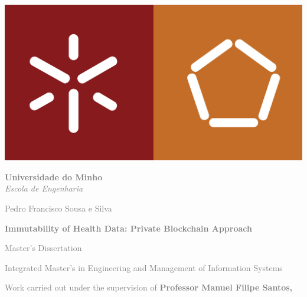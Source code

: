 \begin{titlepage}
\begin{center}

    \begin{minipage}{0.3\textwidth}
        \centering
        \includegraphics[width=\textwidth]{assets/title/symbol.jpg} 
        
        \vspace{0.5cm}

        \raggedright
        \textcolor{gray}{\textbf{Universidade do Minho}}\\
        \textcolor{gray}{\textit{Escola de Engenharia}} 

        \vspace{3cm}
        \begin{adjustwidth}{0cm}{-2cm}
        \textcolor{gray}{Pedro Francisco Sousa e Silva}
        \end{adjustwidth}
        
        \vspace{0.5cm}
        \begin{adjustwidth}{0cm}{-2cm}
        \textcolor{gray}{\textbf{Immutability of Health Data: Private Blockchain Approach}}
        \end{adjustwidth}
        
        \vspace{4cm}
        \begin{adjustwidth}{0cm}{-2cm}
        \textcolor{gray}{Master's Dissertation}
        \end{adjustwidth}
        
        \begin{adjustwidth}{0cm}{-2cm}
        \textcolor{gray}{Integrated Master's in Engineering and Management of Information Systems}
        \end{adjustwidth}
        \vspace{2cm}
        \begin{adjustwidth}{0cm}{-2cm}
        \textcolor{gray}{Work carried out under the supervision of
        \textbf{Professor Manuel Filipe Santos, }}
        \end{adjustwidth}
        

\end{minipage}
\end{center}
\end{titlepage}
